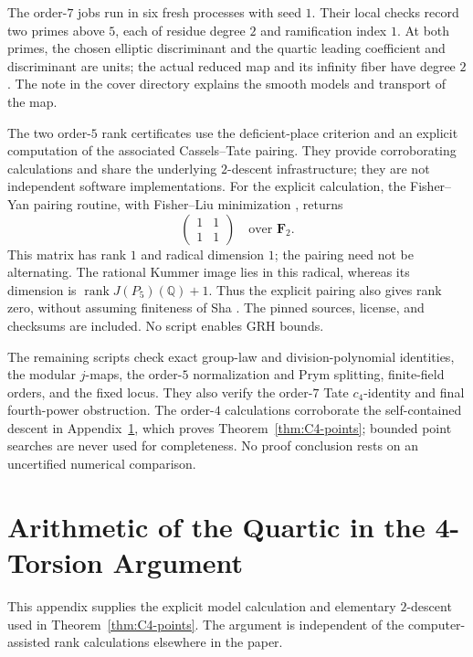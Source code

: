 \documentclass[11pt,a4paper]{amsart}
\theoremstyle{definition}
\theoremstyle{remark}
\numberwithin{equation}{section}
\newcommand{\Q}{\mathbb{Q}}
\newcommand{\rank}{\operatorname{rank}}
\begin{document}
The order-\(7\) jobs run in six fresh processes with seed \(1\).
Their local checks record two primes above \(5\), each of residue
degree \(2\) and ramification index \(1\). At both primes, the chosen
elliptic discriminant and the quartic leading coefficient and
discriminant are units; the actual reduced map and its infinity fiber
have degree \(2\). The note  in the cover
directory explains the smooth models and transport of the map.

The two order-\(5\) rank certificates use the deficient-place
criterion and an explicit computation of the associated Cassels--Tate
pairing. They provide corroborating calculations and share the underlying
\(2\)-descent infrastructure; they are not independent software
implementations. For the explicit calculation, the Fisher--Yan pairing
routine, with Fisher--Liu minimization
\cite{fisherYanCasselsTate,fisherLiuMinimisation}, returns
\[
\begin{pmatrix}1&1\\1&1\end{pmatrix}
\quad\text{over }\mathbf F_2.
\]
This matrix has rank \(1\) and radical dimension \(1\); the pairing need
not be alternating. The rational Kummer image lies in this radical,
whereas its dimension is \(\rank J(P_5)(\Q)+1\). Thus the explicit
pairing also gives rank zero, without assuming finiteness of Sha
\cite[Section~3]{fisherYanCasselsTate}. The pinned sources, license, and
checksums are included. No script enables GRH bounds.

The remaining scripts check exact group-law and division-polynomial
identities, the modular \(j\)-maps, the order-\(5\) normalization and Prym
splitting, finite-field orders, and the fixed locus. They also verify the
order-\(7\) Tate \(c_4\)-identity and final fourth-power obstruction. The
order-\(4\) calculations corroborate the self-contained descent in
Appendix~\ref{app:C4-descent}, which proves Theorem~\ref{thm:C4-points}; bounded point searches are never used for
completeness. No proof conclusion rests on an uncertified numerical
comparison.

\FloatBarrier
\section{Arithmetic of the Quartic in the 4-Torsion Argument}\label{app:C4-descent}

This appendix supplies the explicit model calculation and elementary
$2$-descent used in Theorem~\ref{thm:C4-points}. The argument is independent
of the computer-assisted rank calculations elsewhere in the paper.
\end{document}
